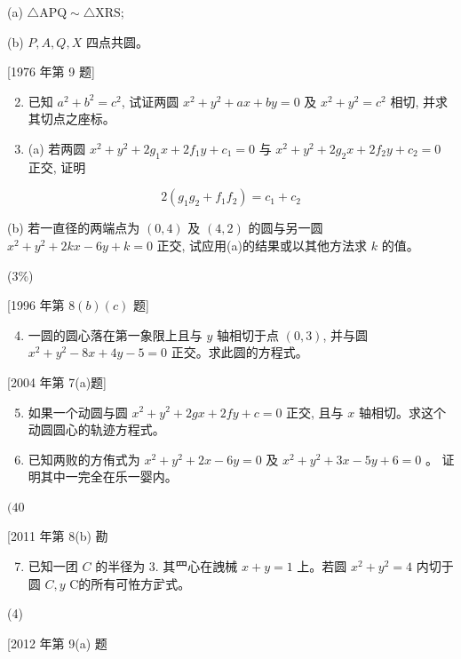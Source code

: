 \documentclass[10pt]{article}
\begin{document}
(a) $\triangle \mathrm{APQ} \sim \triangle \mathrm{XRS}$;

(b) $P, A, Q, X$ 四点共圆。

[1976 年第 9 题]

\begin{enumerate}
  \setcounter{enumi}{1}
  \item 已知 $a^{2}+b^{2}=c^{2}$, 试证两圆 $x^{2}+y^{2}+a x+b y=0$ 及 $x^{2}+y^{2}=c^{2}$ 相切, 并求其切点之座标。

  \item (a) 若两圆 $x^{2}+y^{2}+2 g_{1} x+2 f_{1} y+c_{1}=0$ 与 $x^{2}+y^{2}+2 g_{2} x+2 f_{2} y+c_{2}=0$ 正交, 证明

\end{enumerate}

$$
2\left(g_{1} g_{2}+f_{1} f_{2}\right)=c_{1}+c_{2}
$$

(b) 若一直径的两端点为 $(0,4)$ 及 $(4,2)$ 的圆与另一圆 $x^{2}+y^{2}+2 k x-6 y+k=0$ 正交, 试应用(a)的结果或以其他方法求 $k$ 的值。

(3\%)

[1996 年第 $8(b)(c)$ 题]

\begin{enumerate}
  \setcounter{enumi}{3}
  \item 一圆的圆心落在第一象限上且与 $y$ 轴相切于点 $(0,3)$, 并与圆 $x^{2}+y^{2}-8 x+4 y-5=0$ 正交。求此圆的方程式。
\end{enumerate}

[2004 年第 7(a)题]

\begin{enumerate}
  \setcounter{enumi}{4}
  \item 如果一个动圆与圆 $x^{2}+y^{2}+2 g x+2 f y+c=0$ 正交, 且与 $x$ 轴相切。求这个动圆圆心的轨迹方程式。

  \item 已知两败的方侑式为 $x^{2}+y^{2}+2 x-6 y=0$ 及 $x^{2}+y^{2}+3 x-5 y+6=0$ 。 证明其中一完全在乐一婴内。

\end{enumerate}

$(40$

[2011 年第 8(b) 勘

\begin{enumerate}
  \setcounter{enumi}{6}
  \item 已知一团 $C$ 的半径为 3. 其罒心在䛖械 $x+y=1$ 上。若圆 $x^{2}+y^{2}=4$ 内切于圆 $C, y$ C的所有可恠方㱐式。
\end{enumerate}

(4)

[2012 年第 9(a) 题
\end{document}
